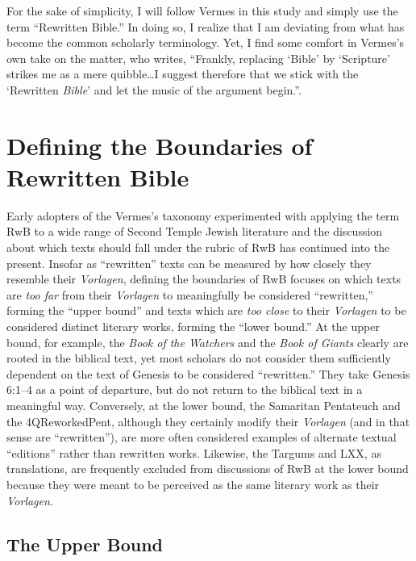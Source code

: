 For the sake of simplicity, I will follow Vermes in this study and
simply use the term ``Rewritten Bible.'' In doing so, I realize that I
am deviating from what has become the common scholarly terminology. Yet,
I find some comfort in Vermes's own take on the matter, who writes,
``Frankly, replacing `Bible' by `Scripture' strikes me as a mere
quibble\ldots{}I suggest therefore that we stick with the `Rewritten
\emph{Bible}' and let the music of the argument
begin.''\autocite[original emphasis]{vermes_zsengeller2014}.

\section{Defining the Boundaries of
Rewritten Bible}\label{defining-the-boundaries-of-rwb}

Early adopters of the Vermes's taxonomy experimented with applying the
term RwB to a wide range of Second Temple Jewish literature and the
discussion about which texts should fall under the rubric of RwB has
continued into the present. Insofar as ``rewritten'' texts can be
measured by how closely they resemble their \emph{Vorlagen}, defining
the boundaries of RwB focuses on which texts are \emph{too far} from
their \emph{Vorlagen} to meaningfully be considered ``rewritten,''
forming the ``upper bound'' and texts which are \emph{too close} to
their \emph{Vorlagen} to be considered distinct literary works, forming
the ``lower bound.'' At the upper bound, for example, the \emph{Book of
the Watchers} and the \emph{Book of Giants} clearly are rooted in the
biblical text, yet most scholars do not consider them sufficiently
dependent on the text of Genesis to be considered ``rewritten.'' They
take Genesis 6:1--4 as a point of departure, but do not return to the
biblical text in a meaningful way. Conversely, at the lower bound, the
Samaritan Pentateuch and the 4QReworkedPent, although they certainly
modify their \emph{Vorlagen} (and in that sense are ``rewritten''), are
more often considered examples of alternate textual ``editions'' rather
than rewritten works. Likewise, the Targums and LXX, as translations,
are frequently excluded from discussions of RwB at the lower bound
because they were meant to be perceived as the same literary work as
their \emph{Vorlagen}.

\subsection{The Upper Bound}\label{the-upper-bound}

